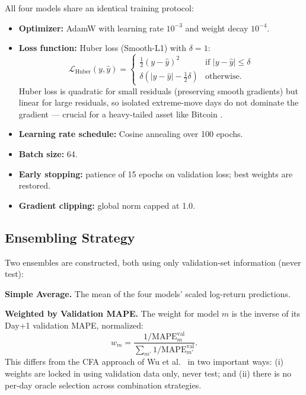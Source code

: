 \documentclass[12pt]{article}
\begin{document}
All four models share an identical training protocol:
\begin{itemize}[leftmargin=*]
    \item \textbf{Optimizer:} AdamW with learning rate $10^{-3}$ and weight decay $10^{-4}$.
    \item \textbf{Loss function:} Huber loss (Smooth-L1) with $\delta = 1$:
    \begin{equation}
        \mathcal{L}_\mathrm{Huber}(y,\hat{y}) =
        \begin{cases}
            \frac{1}{2}(y - \hat{y})^2 & \text{if } |y - \hat{y}| \leq \delta \\
            \delta(|y - \hat{y}| - \tfrac{1}{2}\delta) & \text{otherwise}.
        \end{cases}
        \label{eq:huber}
    \end{equation}
    Huber loss is quadratic for small residuals (preserving smooth gradients) but linear for large residuals, so isolated extreme-move days do not dominate the gradient --- crucial for a heavy-tailed asset like Bitcoin \cite{jin2025tcn}.
    \item \textbf{Learning rate schedule:} Cosine annealing over 100 epochs.
    \item \textbf{Batch size:} 64.
    \item \textbf{Early stopping:} patience of 15 epochs on validation loss; best weights are restored.
    \item \textbf{Gradient clipping:} global norm capped at 1.0.
\end{itemize}

\subsection{Ensembling Strategy}

Two ensembles are constructed, both using only validation-set information (never test):

\textbf{Simple Average.} The mean of the four models' scaled log-return predictions.

\textbf{Weighted by Validation MAPE.} The weight for model $m$ is the inverse of its Day+1 validation MAPE, normalized:
\begin{equation}
    w_m = \frac{1/\mathrm{MAPE}^{\mathrm{val}}_m}{\sum_{m'}1/\mathrm{MAPE}^{\mathrm{val}}_{m'}}.
\end{equation}
This differs from the CFA approach of Wu et al.\ \cite{wu2025cfa} in two important ways: (i) weights are locked in using validation data only, never test; and (ii) there is no per-day oracle selection across combination strategies.
\end{document}
